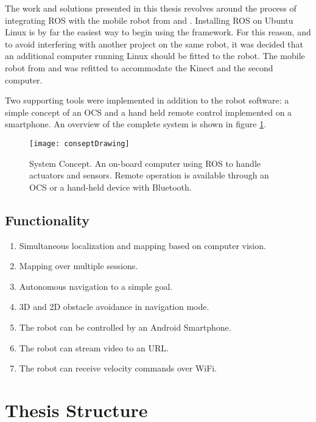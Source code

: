 The work and solutions presented in this thesis revolves around the process of integrating ROS with the mobile robot from \cite{aspunvik} and \cite{berg}. Installing ROS on Ubuntu Linux is by far the easiest way to begin using the framework. For this reason, and to avoid interfering with another project on the same robot, it was decided that an additional computer running Linux should be fitted to the robot. The mobile robot from \cite{aspunvik} and \cite{berg} was refitted to accommodate the Kinect and the second computer.

Two supporting tools were implemented in addition to the robot software: a simple concept of an \ac{OCS} and a hand held remote control implemented on a smartphone. An overview of the complete system is shown in figure \ref{fig:conseptDrawing}.

\begin{figure}[h]
	\centering
	\texttt{[image: conseptDrawing]}
	\caption{System Concept. An on-board computer using \ac{ROS} to handle actuators and sensors. Remote operation is available through an \ac{OCS} or a hand-held device with Bluetooth.}
	\label{fig:conseptDrawing}
\end{figure}

\subsection{Functionality}

\begin{enumerate}
\item Simultaneous localization and mapping based on computer vision.
\item Mapping over multiple sessions.
\item Autonomous navigation to a simple goal.
\item 3D and 2D obstacle avoidance in navigation mode.
\item The robot can be controlled by an Android Smartphone.
\item The robot can stream video to an URL.
\item The robot can receive velocity commands over WiFi.
\end{enumerate} 

\section{Thesis Structure}